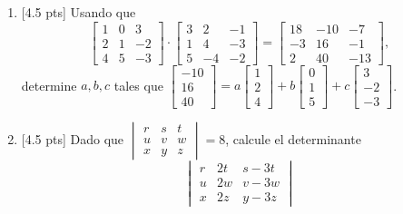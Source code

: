 \documentclass[11pt]{article}
\begin{document}
\begin{enumerate}
\item{}[4.5 pts] Usando que
\[
\begin{bmatrix}1&0&3\\2&1&-2\\4&5&-3\end{bmatrix}\cdot\begin{bmatrix}3&2&-1\\1&4&-3\\5&-4&-2\end{bmatrix} = \begin{bmatrix}18&-10&-7\\-3&16&-1\\2&40&-13\end{bmatrix},
\]
determine $a,b,c$ tales que $\begin{bmatrix}-10\\16\\40\end{bmatrix} = a\begin{bmatrix}1\\2\\4\end{bmatrix} + b\begin{bmatrix}0\\1\\5\end{bmatrix} + c\begin{bmatrix}3\\-2\\-3\end{bmatrix}$.

\vspace{4pt}

\item{}[4.5 pts] Dado que $\begin{vmatrix}r&s&t\\u&v&w\\x&y&z\end{vmatrix} = 8$, calcule el determinante
\[
\begin{vmatrix}r & 2t & s-3t\\ u & 2w & v-3w\\ x & 2z & y-3z\end{vmatrix}
\]

\vspace{4pt}


\end{enumerate}
\end{document}
